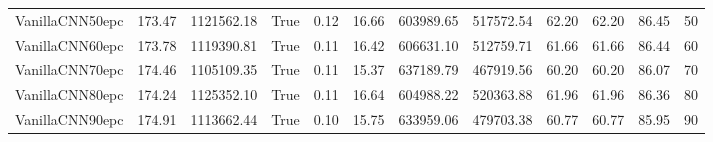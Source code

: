 \begin{tabular}{lrrlrrrrrrrl}
VanillaCNN50epc & 173.47 & 1121562.18 & True & 0.12 & 16.66 & 603989.65 & 517572.54 & 62.20 & 62.20 & 86.45 & 50 \\
VanillaCNN60epc & 173.78 & 1119390.81 & True & 0.11 & 16.42 & 606631.10 & 512759.71 & 61.66 & 61.66 & 86.44 & 60 \\
VanillaCNN70epc & 174.46 & 1105109.35 & True & 0.11 & 15.37 & 637189.79 & 467919.56 & 60.20 & 60.20 & 86.07 & 70 \\
VanillaCNN80epc & 174.24 & 1125352.10 & True & 0.11 & 16.64 & 604988.22 & 520363.88 & 61.96 & 61.96 & 86.36 & 80 \\
VanillaCNN90epc & 174.91 & 1113662.44 & True & 0.10 & 15.75 & 633959.06 & 479703.38 & 60.77 & 60.77 & 85.95 & 90 \\
\bottomrule
\end{tabular}
